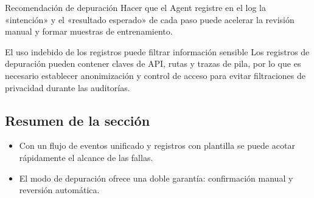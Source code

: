 \begin{knowledgebox}{Recomendación de depuración}
Hacer que el Agent registre en el log la «intención» y el «resultado esperado» de cada paso puede acelerar la revisión manual y formar muestras de entrenamiento.
\end{knowledgebox}

\begin{warningbox}{El uso indebido de los registros puede filtrar información sensible}
Los registros de depuración pueden contener claves de API, rutas y trazas de pila, por lo que es necesario establecer anonimización y control de acceso para evitar filtraciones de privacidad durante las auditorías.
\end{warningbox}

\subsection{Resumen de la sección}
\begin{itemize}
    \item Con un flujo de eventos unificado y registros con plantilla se puede acotar rápidamente el alcance de las fallas.
    \item El modo de depuración ofrece una doble garantía: confirmación manual y reversión automática.
\end{itemize}
